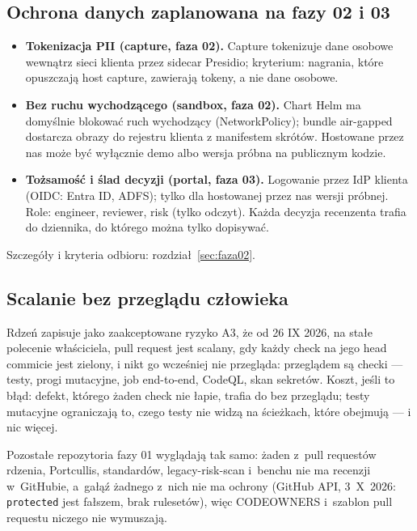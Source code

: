 
\subsection{Ochrona danych zaplanowana na fazy 02 i 03}\label{sec:bezpieczenstwo-plan}

\begin{itemize}
  \item \textbf{Tokenizacja PII (capture, faza 02).} Capture tokenizuje dane osobowe
        wewnątrz sieci klienta przez sidecar Presidio; kryterium: nagrania, które opuszczają
        host capture, zawierają tokeny, a nie dane osobowe.
  \item \textbf{Bez ruchu wychodzącego (sandbox, faza 02).} Chart Helm ma domyślnie
        blokować ruch wychodzący (NetworkPolicy); bundle air-gapped dostarcza obrazy do
        rejestru klienta z manifestem skrótów. Hostowane przez nas może być wyłącznie demo
        albo wersja próbna na publicznym kodzie.
  \item \textbf{Tożsamość i ślad decyzji (portal, faza 03).} Logowanie przez IdP klienta
        (OIDC: Entra ID, ADFS);  tylko dla hostowanej przez nas wersji
        próbnej. Role: engineer, reviewer, risk (tylko odczyt). Każda decyzja recenzenta
        trafia do dziennika, do którego można tylko dopisywać.
\end{itemize}

Szczegóły i kryteria odbioru: rozdział~\ref{sec:faza02}.


\subsection{Scalanie bez przeglądu człowieka}\label{sec:bezpieczenstwo-scalanie}

Rdzeń zapisuje jako zaakceptowane ryzyko A3, że od 26 IX 2026, na stałe polecenie
właściciela, pull request jest scalany, gdy każdy check na jego head commicie jest
zielony, i nikt go wcześniej nie przegląda: przeglądem są checki --- testy, progi
mutacyjne, job end-to-end, CodeQL, skan sekretów. Koszt, jeśli to błąd: defekt, którego
żaden check nie łapie, trafia do  bez przeglądu; testy mutacyjne ograniczają
to, czego testy nie widzą na ścieżkach, które obejmują --- i nic więcej.

Pozostałe repozytoria fazy 01 wyglądają tak samo: żaden z~pull requestów rdzenia,
Portcullis, standardów, legacy-risk-scan i~benchu nie ma recenzji w~GitHubie, a~gałąź
 żadnego z~nich nie ma ochrony (GitHub API, 3~X~2026: \texttt{protected} jest
fałszem, brak rulesetów), więc CODEOWNERS i~szablon pull requestu niczego nie wymuszają.

